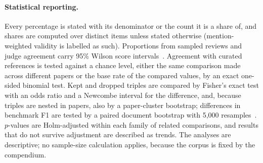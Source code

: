 \documentclass[referee,lineno,pdflatex,sn-vancouver-num]{sn-jnl}
\theoremstyle{thmstyleone}%
\theoremstyle{thmstyletwo}%
\theoremstyle{thmstylethree}%
\begin{document}
\paragraph{Statistical reporting.} Every percentage is stated with its
denominator or the count it is a share of, and shares are computed over
distinct items unless stated otherwise (mention-weighted validity is labelled
as such). Proportions from sampled reviews and judge agreement carry 95\%
Wilson score intervals~\cite{wilson1927}. Agreement with curated references is
tested against a chance level, either the same comparison made across
different papers or the base rate of the compared values, by an exact
one-sided binomial test. Kept and dropped triples are compared by Fisher's
exact test with an odds ratio and a Newcombe interval for the difference, and,
because triples are nested in papers, also by a paper-cluster bootstrap;
differences in benchmark F1 are tested by a paired document bootstrap with
5,000 resamples~\cite{efron1993bootstrap}. $p$-values are Holm-adjusted within
each family of related comparisons, and results that do not survive
adjustment are described as trends. The analyses are descriptive; no
sample-size calculation applies, because the corpus is fixed by the
compendium.
\end{document}
